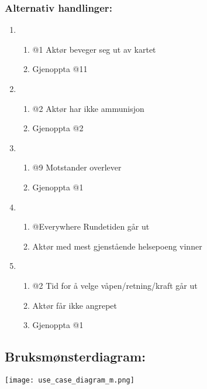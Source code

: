 \documentclass[12pt]{report}
\begin{document}
\subsubsection*{Alternativ handlinger:}

\begin{enumerate}[label=\Alph*]
\item 
\bigskip

\begin{enumerate}
\item @1 Akt{\o}r beveger seg ut av kartet 
\item Gjenoppta @11 
\end{enumerate}
\item 
\bigskip

\begin{enumerate}
\item @2 Akt{\o}r har ikke ammunisjon 
\item Gjenoppta @2 
\end{enumerate}
\item 
\bigskip

\begin{enumerate}
\item @9 Motstander overlever 
\item Gjenoppta @1 
\end{enumerate}
\item 
\bigskip

\begin{enumerate}
\item @Everywhere Rundetiden g{\aa}r ut 
\item Akt{\o}r med mest gjenst{\aa}ende helsepoeng vinner
\end{enumerate}
\item 
\bigskip

\begin{enumerate}
\item @2 Tid for {\aa} velge v{\aa}pen/retning/kraft g{\aa}r ut 
\item Akt{\o}r f{\aa}r ikke angrepet 
\item Gjenoppta @1
\end{enumerate}
\end{enumerate}

\subsection*{Bruksm{\o}nsterdiagram:}

\texttt{[image: use\_case\_diagram\_m.png]}
\end{document}
